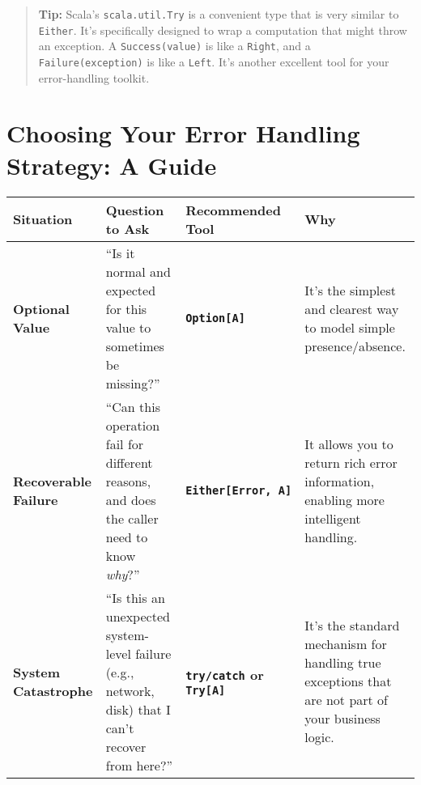 \documentclass[
  letterpaper,
  DIV=11,
  numbers=noendperiod]{scrreprt}
\begin{document}
\begin{quote}
\textbf{Tip:} Scala's \texttt{scala.util.Try} is a convenient type that
is very similar to \texttt{Either}. It's specifically designed to wrap a
computation that might throw an exception. A \texttt{Success(value)} is
like a \texttt{Right}, and a \texttt{Failure(exception)} is like a
\texttt{Left}. It's another excellent tool for your error-handling
toolkit.
\end{quote}

\section{Choosing Your Error Handling Strategy: A
Guide}\label{choosing-your-error-handling-strategy-a-guide}

\begin{longtable}[]{@{}
  >{\raggedright\arraybackslash}p{}
  >{\raggedright\arraybackslash}p{}
  >{\raggedright\arraybackslash}p{}
  >{\raggedright\arraybackslash}p{}@{}}
\toprule\noalign{}
\begin{minipage}[b]{\linewidth}\raggedright
Situation
\end{minipage} & \begin{minipage}[b]{\linewidth}\raggedright
Question to Ask
\end{minipage} & \begin{minipage}[b]{\linewidth}\raggedright
Recommended Tool
\end{minipage} & \begin{minipage}[b]{\linewidth}\raggedright
Why
\end{minipage} \\
\midrule\noalign{}
\endhead
\bottomrule\noalign{}
\endlastfoot
\textbf{Optional Value} & ``Is it normal and expected for this value to
sometimes be missing?'' & \textbf{\texttt{Option{[}A{]}}} & It's the
simplest and clearest way to model simple presence/absence. \\
\textbf{Recoverable Failure} & ``Can this operation fail for different
reasons, and does the caller need to know \emph{why}?'' &
\textbf{\texttt{Either{[}Error,\ A{]}}} & It allows you to return rich
error information, enabling more intelligent handling. \\
\textbf{System Catastrophe} & ``Is this an unexpected system-level
failure (e.g., network, disk) that I can't recover from here?'' &
\textbf{\texttt{try/catch} or \texttt{Try{[}A{]}}} & It's the standard
mechanism for handling true exceptions that are not part of your
business logic. \\
\end{longtable}
\end{document}
